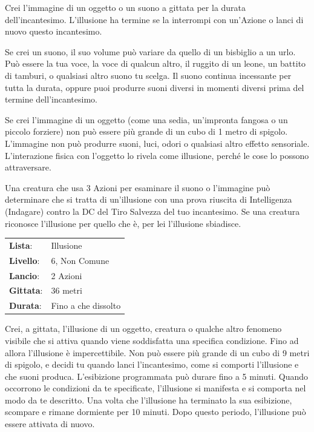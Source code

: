 \begin{multicols}{2}
Crei l'immagine di un oggetto o un suono a gittata per la durata dell'incantesimo. L'illusione ha termine se la interrompi con un'Azione o lanci di nuovo questo incantesimo.

Se crei un suono, il suo volume può variare da quello di un bisbiglio a un urlo. Può essere la tua voce, la voce di qualcun altro, il ruggito di un leone, un battito di tamburi, o qualsiasi altro suono tu scelga. Il suono continua incessante per tutta la durata, oppure puoi produrre suoni diversi in momenti diversi prima del termine dell'incantesimo.

Se crei l'immagine di un oggetto (come una sedia, un'impronta fangosa o un piccolo forziere) non può essere più grande di un cubo di 1 metro di spigolo. L'immagine non può produrre suoni, luci, odori o qualsiasi altro effetto sensoriale. L'interazione fisica con l'oggetto lo rivela come illusione, perché le cose lo possono attraversare.

Una creatura che usa 3 Azioni per esaminare il suono o l'immagine può determinare che si tratta di un'illusione con una prova riuscita di Intelligenza (Indagare) contro la DC del Tiro Salvezza del tuo incantesimo. Se una creatura riconosce l'illusione per quello che è, per lei l'illusione sbiadisce.

\noindent\begin{tabularx}{\linewidth}{p{1.3cm}X}
	\rowcolor{gray!20}\textbf{Lista}: & Illusione \\
	\textbf{Livello}: & 6, Non Comune \\
	\rowcolor{gray!20}\textbf{Lancio}: & 2 Azioni \\
	\textbf{Gittata}: & 36 metri \\
	\rowcolor{gray!20}\textbf{Durata}: & Fino a che dissolto \\
\end{tabularx}\smallskip

Crei, a gittata, l'illusione di un oggetto, creatura o qualche altro fenomeno visibile che si attiva quando viene soddisfatta una specifica condizione. Fino ad allora l'illusione è impercettibile. Non può essere più grande di un cubo di 9 metri di spigolo, e decidi tu quando lanci l'incantesimo, come si comporti l'illusione e che suoni produca. L'esibizione programmata può durare fino a 5 minuti. Quando occorrono le condizioni da te specificate, l'illusione si manifesta e si comporta nel modo da te descritto. Una volta che l'illusione ha terminato la sua esibizione, scompare e rimane dormiente per 10 minuti. Dopo questo periodo, l'illusione può essere attivata di nuovo.


\end{multicols}
